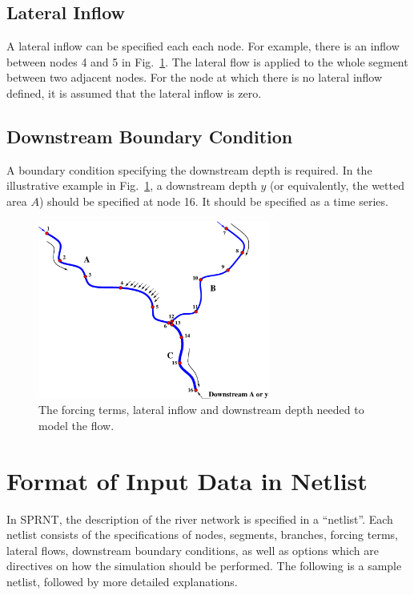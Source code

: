\documentclass[10pt, letterpaper]{article}
\def\epswidth{3.0in}
\begin{document}
\subsection{Lateral Inflow}
\label{subsec:lateral}
A lateral inflow can be specified each each node. For example, there
is an inflow between nodes 4 and 5 in Fig.~\ref{fig:flow}. The lateral flow is
applied to the whole segment between two adjacent nodes. For the node at which there is no
lateral inflow defined, it is assumed that the lateral inflow is zero.

\subsection{Downstream Boundary Condition}
\label{subsec:downbd}
A boundary condition specifying the downstream depth is required. In the illustrative
example in Fig.~\ref{fig:flow}, a downstream depth $y$ (or equivalently, the wetted area
$A$) should be specified at node 16. It should be specified as a time series.

\begin{figure}[hbt]
\centerline{
\includegraphics[width=\epswidth, keepaspectratio=true]{Figs/flow.eps}  
}
\caption{The forcing terms, lateral inflow and downstream depth needed to model the flow.}
\label{fig:flow}
\end{figure}



\section{Format of Input Data in Netlist}
\label{sec:netlist}
In SPRNT, the description of the river network is specified in a ``netlist''. Each
netlist consists of the specifications of nodes, segments, branches, forcing terms,
lateral flows, downstream boundary conditions, as well as options which are directives on how the
simulation should be performed. The following is a sample netlist, followed by more detailed
explanations.
\end{document}
